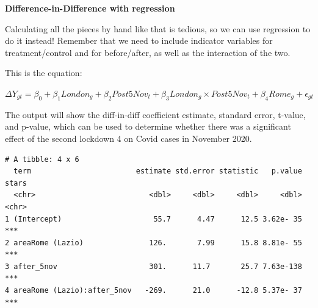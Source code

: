 \documentclass[
  letterpaper,
  DIV=11,
  numbers=noendperiod]{scrreprt}
\newenvironment{Shaded}{\begin{snugshade}}{\end{snugshade}}
\newcommand{\AttributeTok}[1]{\textcolor[rgb]{0.40,0.45,0.13}{#1}}
\newcommand{\CommentTok}[1]{\textcolor[rgb]{0.37,0.37,0.37}{#1}}
\newcommand{\FunctionTok}[1]{\textcolor[rgb]{0.28,0.35,0.67}{#1}}
\newcommand{\NormalTok}[1]{\textcolor[rgb]{0.00,0.23,0.31}{#1}}
\newcommand{\OtherTok}[1]{\textcolor[rgb]{0.00,0.23,0.31}{#1}}
\newcommand{\SpecialCharTok}[1]{\textcolor[rgb]{0.37,0.37,0.37}{#1}}
\begin{document}
\textbf{Difference-in-Difference with regression}

Calculating all the pieces by hand like that is tedious, so we can use
regression to do it instead! Remember that we need to include indicator
variables for treatment/control and for before/after, as well as the
interaction of the two.

This is the equation:

\(\Delta Y_{gt} = \beta_0 + \beta_1 London_{g} + \beta_2 Post5Nov_{t} + \beta_3 London_{g} \times Post5Nov_{t} + \beta_4 Rome_{g} + \epsilon_{gt}\)

The output will show the diff-in-diff coefficient estimate, standard
error, t-value, and p-value, which can be used to determine whether
there was a significant effect of the second lockdown 4 on Covid cases
in November 2020.

\begin{Shaded}
\end{Shaded}

\begin{verbatim}
# A tibble: 4 x 6
  term                        estimate std.error statistic   p.value stars
  <chr>                          <dbl>     <dbl>     <dbl>     <dbl> <chr>
1 (Intercept)                     55.7      4.47      12.5 3.62e- 35 ***  
2 areaRome (Lazio)               126.       7.99      15.8 8.81e- 55 ***  
3 after_5nov                     301.      11.7       25.7 7.63e-138 ***  
4 areaRome (Lazio):after_5nov   -269.      21.0      -12.8 5.37e- 37 ***  
\end{verbatim}
\end{document}
